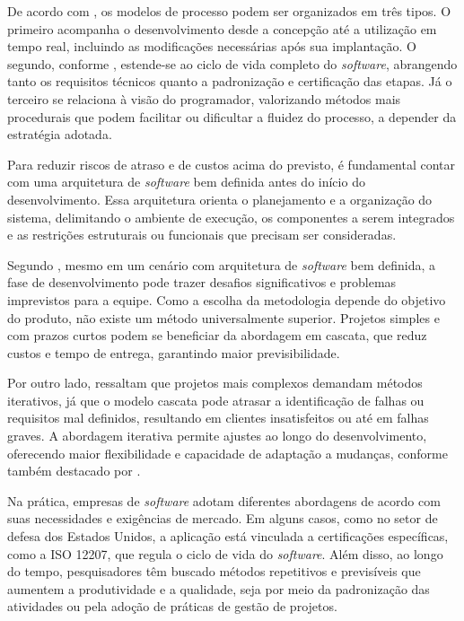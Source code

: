 \documentclass[english,brazilian]{UNISINOSartigo} %
\begin{document}
De acordo com , os modelos de processo podem ser organizados em três tipos. O primeiro acompanha o desenvolvimento desde a concepção até a utilização em tempo real, incluindo as modificações necessárias após sua implantação. O segundo, conforme , estende-se ao ciclo de vida completo do \textit{software}, abrangendo tanto os requisitos técnicos quanto a padronização e certificação das etapas. Já o terceiro se relaciona à visão do programador, valorizando métodos mais procedurais que podem facilitar ou dificultar a fluidez do processo, a depender da estratégia adotada.

Para reduzir riscos de atraso e de custos acima do previsto, é fundamental contar com uma arquitetura de \textit{software} bem definida antes do início do desenvolvimento. Essa arquitetura orienta o planejamento e a organização do sistema, delimitando o ambiente de execução, os componentes a serem integrados e as restrições estruturais ou funcionais que precisam ser consideradas.

Segundo , mesmo em um cenário com arquitetura de \textit{software} bem definida, a fase de desenvolvimento pode trazer desafios significativos e problemas imprevistos para a equipe. Como a escolha da metodologia depende do objetivo do produto, não existe um método universalmente superior. Projetos simples e com prazos curtos podem se beneficiar da abordagem em cascata, que reduz custos e tempo de entrega, garantindo maior previsibilidade.

Por outro lado,  ressaltam que projetos mais complexos demandam métodos iterativos, já que o modelo cascata pode atrasar a identificação de falhas ou requisitos mal definidos, resultando em clientes insatisfeitos ou até em falhas graves. A abordagem iterativa permite ajustes ao longo do desenvolvimento, oferecendo maior flexibilidade e capacidade de adaptação a mudanças, conforme também destacado por .

Na prática, empresas de \textit{software} adotam diferentes abordagens de acordo com suas necessidades e exigências de mercado. Em alguns casos, como no setor de defesa dos Estados Unidos, a aplicação está vinculada a certificações específicas, como a ISO 12207, que regula o ciclo de vida do \textit{software}. Além disso, ao longo do tempo, pesquisadores têm buscado métodos repetitivos e previsíveis que aumentem a produtividade e a qualidade, seja por meio da padronização das atividades ou pela adoção de práticas de gestão de projetos.
\end{document}
